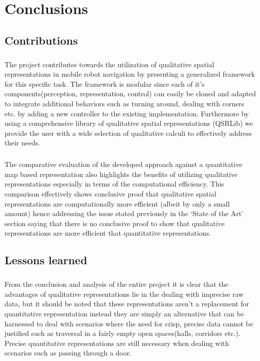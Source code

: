 
\chapter{Conclusions}

\section{Contributions}
\paragraph{}The project contributes towards the utilization of qualitative spatial representations in mobile robot navigation by presenting a generalized framework for this specific task. The framework is modular since each of it's components(perception, representation, control) can easily be cloned and adapted to integrate additional behaviors such as turning around, dealing with corners etc. by adding a new controller to the existing implementation. Furthermore by using a comprehensive library of qualitative spatial representations (QSRLib) we provide the user with a wide selection of qualitative calculi to effectively address their needs.

\paragraph{}The comparative evaluation of the developed approach against a quantitative map based representation also highlights the benefits of utilizing qualitative representations especially in terms of the computational efficiency. This comparison effectively shows conclusive proof that qualitative spatial representations are computationally more efficient (albeit by only a small amount) hence addressing the issue stated previously in the `State of the Art' section saying that there is no conclusive proof to show that qualitative representations are more efficient that quantitative representations. 

\section{Lessons learned}

\paragraph{} From the conclusion and analysis of the entire project it is clear that the advantages of qualitative representations lie in the dealing with imprecise raw data, but it should be noted that these representations aren't a replacement for quantitative representation instead they are simply an alternative that can be harnessed to deal with scenarios where the need for crisp, precise data cannot be justified such as traversal in a fairly empty open spaces(halls, corridors etc.). Precise quantitative representations are still necessary when dealing with scenarios such as passing through a door.


